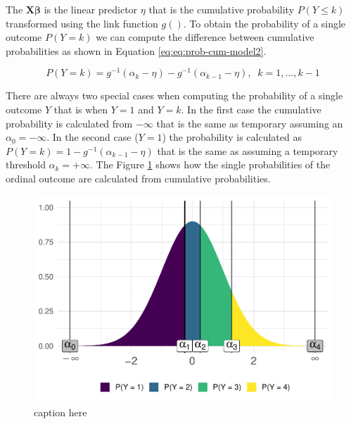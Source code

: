 \documentclass[
  man,floatsintext]{apa6}
\begin{document}
The \(\mathbf{X} \boldsymbol{\beta}\) is the linear predictor \(\eta\) that is the cumulative probability \(P(Y \leq k)\) transformed using the link function \(g()\). To obtain the probability of a single outcome \(P(Y = k)\) we can compute the difference between cumulative probabilities as shown in Equation \eqref{eq:eq:prob-cum-model2}.

\begin{equation} 
P(Y = k) = g^{-1}(\alpha_k - \eta) -  g^{-1}(\alpha_{k - 1} - \eta), \;\;k = 1, \dots, k - 1
\label{eq:prob-cum-model2}
\end{equation}

There are always two special cases when computing the probability of a single outcome \(Y\) that is when \(Y = 1\) and \(Y = k\). In the first case the cumulative probability is calculated from \(-\infty\) that is the same as temporary assuming an \(\alpha_0 = -\infty\). In the second case (\(Y = 1\)) the probability is calculated as \(P(Y = k) = 1 - g^{-1}(\alpha_{k - 1} - \eta)\) that is the same as assuming a temporary threshold \(\alpha_k = +\infty\). The Figure \ref{fig:fig-explain-cumulative} shows how the single probabilities of the ordinal outcome are calculated from cumulative probabilities.

\scriptsize

\begin{figure}

{\centering \includegraphics{paper-new_files/figure-latex/fig-explain-cumulative-1} 

}

\caption{caption here}\label{fig:fig-explain-cumulative}
\end{figure}
\end{document}
